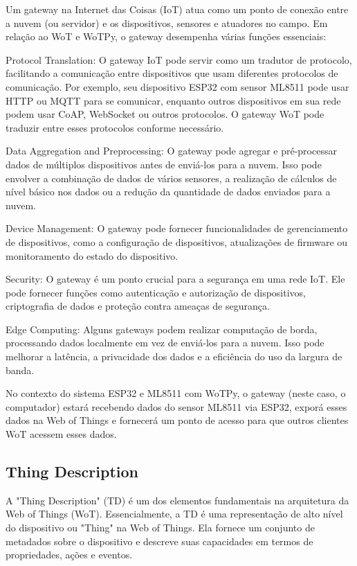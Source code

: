Um gateway na Internet das Coisas (IoT) atua como um ponto de conexão entre a nuvem (ou servidor) e os dispositivos, sensores e atuadores no campo. Em relação ao WoT e WoTPy, o gateway desempenha várias funções essenciais:

Protocol Translation: O gateway IoT pode servir como um tradutor de protocolo, facilitando a comunicação entre dispositivos que usam diferentes protocolos de comunicação. Por exemplo, seu dispositivo ESP32 com sensor ML8511 pode usar HTTP ou MQTT para se comunicar, enquanto outros dispositivos em sua rede podem usar CoAP, WebSocket ou outros protocolos. O gateway WoT pode traduzir entre esses protocolos conforme necessário.

Data Aggregation and Preprocessing: O gateway pode agregar e pré-processar dados de múltiplos dispositivos antes de enviá-los para a nuvem. Isso pode envolver a combinação de dados de vários sensores, a realização de cálculos de nível básico nos dados ou a redução da quantidade de dados enviados para a nuvem.

Device Management: O gateway pode fornecer funcionalidades de gerenciamento de dispositivos, como a configuração de dispositivos, atualizações de firmware ou monitoramento do estado do dispositivo.

Security: O gateway é um ponto crucial para a segurança em uma rede IoT. Ele pode fornecer funções como autenticação e autorização de dispositivos, criptografia de dados e proteção contra ameaças de segurança.

Edge Computing: Alguns gateways podem realizar computação de borda, processando dados localmente em vez de enviá-los para a nuvem. Isso pode melhorar a latência, a privacidade dos dados e a eficiência do uso da largura de banda.

No contexto do sistema ESP32 e ML8511 com WoTPy, o gateway (neste caso, o computador) estará recebendo dados do sensor ML8511 via ESP32, exporá esses dados na Web of Things e fornecerá um ponto de acesso para que outros clientes WoT acessem esses dados.

\subsection{Thing Description}

A "Thing Description" (TD) é um dos elementos fundamentais na arquitetura da Web of Things (WoT). Essencialmente, a TD é uma representação de alto nível do dispositivo ou "Thing" na Web of Things. Ela fornece um conjunto de metadados sobre o dispositivo e descreve suas capacidades em termos de propriedades, ações e eventos.

